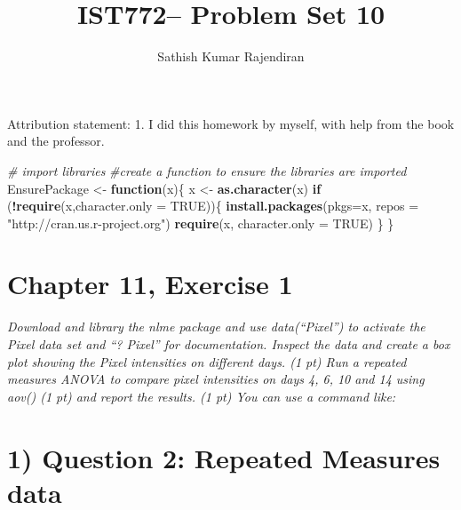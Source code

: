 \documentclass[]{article}
\title{IST772-- Problem Set 10}
\author{Sathish Kumar Rajendiran}
\date{}
\newenvironment{Shaded}{\begin{snugshade}}{\end{snugshade}}
\newcommand{\CommentTok}[1]{\textcolor[rgb]{0.56,0.35,0.01}{\textit{#1}}}
\newcommand{\ControlFlowTok}[1]{\textcolor[rgb]{0.13,0.29,0.53}{\textbf{#1}}}
\newcommand{\DataTypeTok}[1]{\textcolor[rgb]{0.13,0.29,0.53}{#1}}
\newcommand{\KeywordTok}[1]{\textcolor[rgb]{0.13,0.29,0.53}{\textbf{#1}}}
\newcommand{\NormalTok}[1]{#1}
\newcommand{\OperatorTok}[1]{\textcolor[rgb]{0.81,0.36,0.00}{\textbf{#1}}}
\newcommand{\OtherTok}[1]{\textcolor[rgb]{0.56,0.35,0.01}{#1}}
\newcommand{\StringTok}[1]{\textcolor[rgb]{0.31,0.60,0.02}{#1}}
\begin{document}
\maketitle

Attribution statement: 1. I did this homework by myself, with help from
the book and the professor.

\begin{Shaded}
\begin{Highlighting}[]
\CommentTok{# import libraries }
\CommentTok{#create a function to ensure the libraries are imported}
\NormalTok{EnsurePackage <-}\StringTok{ }\ControlFlowTok{function}\NormalTok{(x)\{}
\NormalTok{  x <-}\StringTok{ }\KeywordTok{as.character}\NormalTok{(x)}
    \ControlFlowTok{if}\NormalTok{ (}\OperatorTok{!}\KeywordTok{require}\NormalTok{(x,}\DataTypeTok{character.only =} \OtherTok{TRUE}\NormalTok{))\{}
      \KeywordTok{install.packages}\NormalTok{(}\DataTypeTok{pkgs=}\NormalTok{x, }\DataTypeTok{repos =} \StringTok{"http://cran.us.r-project.org"}\NormalTok{)}
      \KeywordTok{require}\NormalTok{(x, }\DataTypeTok{character.only =} \OtherTok{TRUE}\NormalTok{)}
\NormalTok{    \}}
\NormalTok{  \}}
\end{Highlighting}
\end{Shaded}

\hypertarget{chapter-11-exercise-1}{%
\section{Chapter 11, Exercise 1}\label{chapter-11-exercise-1}}

\emph{Download and library the nlme package and use data(``Pixel'') to
activate the Pixel data set and ``? Pixel'' for documentation. Inspect
the data and create a box plot showing the Pixel intensities on
different days. (1 pt) Run a repeated measures ANOVA to compare pixel
intensities on days 4, 6, 10 and 14 using aov() (1 pt) and report the
results. (1 pt) You can use a command like:}

\hypertarget{question-2-repeated-measures-data}{%
\section{1) Question 2: Repeated Measures
data}\label{question-2-repeated-measures-data}}
\end{document}
